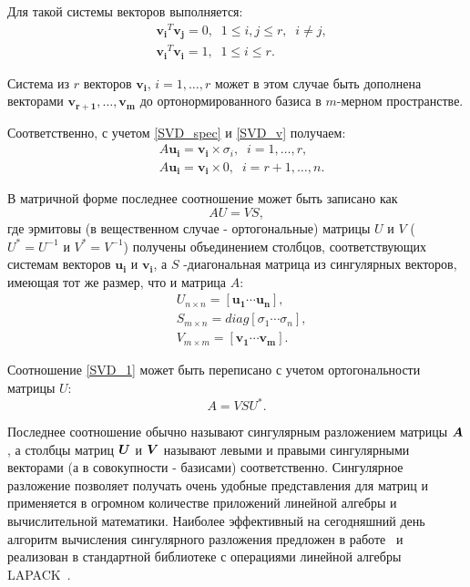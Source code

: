 \documentclass[a4paper,12pt,russian]{article} %
\begin{document}
	Для такой системы векторов выполняется: 
	\begin{equation}\label{SVD_vect_syst}
		\begin{split}
			& \bm{v_i}^T \bm{v_j} = 0, \;\; 1   \leq i,j \leq r, \;\; i \neq j,\\
			& \bm{v_i}^T \bm{v_i} = 1, \;\; 1   \leq i \leq r. 
		\end{split}
	\end{equation}
	
	Система из $r$ векторов $\bm{v_i}$, $i=1,\ldots,r$ может в этом случае быть дополнена векторами $\bm{v_{r+1}}, \ldots, \bm{v_{m}}$ до ортонормированного базиса в $m$-мерном пространстве.
	
	Соответственно, с учетом \ref{SVD_spec} и \ref{SVD_v} получаем:
	\begin{equation}\label{SVD_vect_syst}
		\begin{split}
			& A \bm{u_i} = \bm{v_i} \times \sigma_i, \;\; i=1,\ldots,r, \\
			& A \bm{u_i} = \bm{v_i} \times 0       , \;\; i=r+1,\ldots,n. 
		\end{split}
	\end{equation}
	
	В матричной форме последнее соотношение может быть записано как
	\begin{equation}\label{SVD_1}
	A U = V S,
	\end{equation}
	где	эрмитовы (в вещественном случае - ортогональные) матрицы $U$ и $V$ ($U^* = U^{-1}$ и $V^* = V^{-1}$) получены объединением столбцов, соответствующих системам векторов $\bm{u_i}$ и $\bm{v_i}$, а $S$ -диагональная матрица из сингулярных векторов, имеющая тот же размер, что и матрица $A$: 
	\begin{equation}\label{SVD_UV}
		\begin{split}
			& U_{n \times n} = [\bm{u_1} \cdots \bm{u_n}], \\
			& S_{m \times n} = diag[\sigma_1 \cdots \sigma_n], \\
			& V_{m \times m} = [\bm{v_1} \cdots \bm{v_m}].
		\end{split}
	\end{equation}
	
	Соотношение \ref{SVD_1} может быть переписано с учетом ортогональности матрицы $U$:
	\begin{equation}\label{SVD_2}
		A = V S U^*.
	\end{equation}	
	
Последнее соотношение обычно называют сингулярным разложением матрицы $\bm{A}$, а столбцы матриц $\bm{U}$ и $\bm{V}$ называют левыми и правыми сингулярными векторами (а в совокупности - базисами) соответственно.
Сингулярное разложение позволяет получать очень удобные представления для матриц и применяется в огромном количестве приложений линейной алгебры и вычислительной математики.
Наиболее эффективный на сегодняшний день алгоритм вычисления сингулярного разложения предложен в работе~\cite{svd} и реализован в стандартной библиотеке с операциями линейной алгебры LAPACK~\cite{lapack}.
\end{document}
